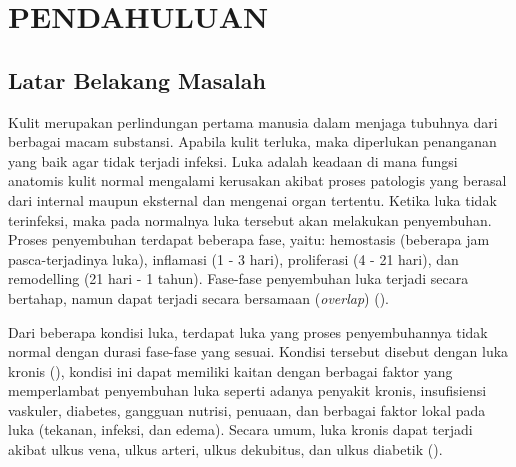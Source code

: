 
\chapter{PENDAHULUAN}

\section{Latar Belakang Masalah}

Kulit merupakan perlindungan pertama manusia dalam menjaga 
tubuhnya dari berbagai macam substansi. Apabila kulit 
terluka, maka diperlukan penanganan yang baik agar tidak 
terjadi infeksi.  Luka adalah keadaan di mana fungsi 
anatomis kulit normal mengalami kerusakan akibat proses 
patologis yang berasal dari internal maupun eksternal dan 
mengenai organ tertentu. Ketika luka tidak terinfeksi, 
maka pada normalnya luka tersebut akan melakukan 
penyembuhan. Proses penyembuhan terdapat beberapa fase, 
yaitu: hemostasis (beberapa jam pasca-terjadinya luka), 
inflamasi (1 - 3 hari), proliferasi (4 - 21 hari), dan 
remodelling (21 hari - 1 tahun). Fase-fase penyembuhan luka 
terjadi secara bertahap, namun dapat terjadi secara 
bersamaan (\textit{overlap}) (\cite{simon}).

Dari beberapa kondisi luka, terdapat luka yang proses 
penyembuhannya tidak normal dengan durasi fase-fase yang 
sesuai. Kondisi tersebut disebut dengan luka kronis 
(\cite{landen}), kondisi ini dapat memiliki kaitan dengan 
berbagai faktor yang memperlambat penyembuhan luka seperti 
adanya penyakit kronis, insufisiensi vaskuler, diabetes, 
gangguan nutrisi, penuaan, dan berbagai faktor lokal pada 
luka (tekanan, infeksi, dan edema). Secara umum, luka 
kronis dapat terjadi akibat ulkus vena, ulkus arteri, ulkus 
dekubitus, dan ulkus diabetik (\cite{zhao}).


